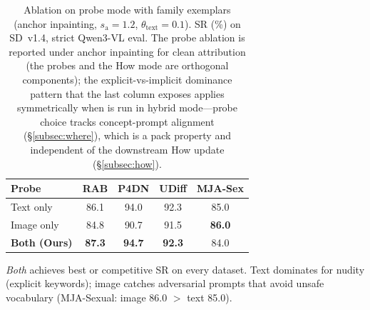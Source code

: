 \begin{table}[!tb]
    \centering
    \renewcommand{\arraystretch}{1.15}
    \setlength{\tabcolsep}{0.6em}
    \caption{Ablation on probe mode with family exemplars (anchor inpainting, $s_\text{a}{=}1.2$, $\theta_\text{text}{=}0.1$). SR (\%) on SD~v1.4, strict Qwen3-VL eval. The probe ablation is reported under anchor inpainting for clean attribution (the probes and the How mode are orthogonal components); the explicit-vs-implicit dominance pattern that the last column exposes applies symmetrically when \ours{} is run in hybrid mode---probe choice tracks concept-prompt alignment (\S\ref{subsec:where}), which is a pack property and independent of the downstream How update (\S\ref{subsec:how}).}
    \label{table:probe}
    \vspace{2pt}
    \small
    \begin{tabular}{lcccc}
    \toprule
    \textbf{Probe} & \textbf{RAB} & \textbf{P4DN} & \textbf{UDiff} & \textbf{MJA-Sex} \\
    \midrule
    Text only  & 86.1 & 94.0 & 92.3 & 85.0 \\
    Image only & 84.8 & 90.7 & 91.5 & \textbf{86.0} \\
    \rowcolor{blue!8} \textbf{Both (Ours)} & \textbf{87.3} & \textbf{94.7} & \textbf{92.3} & 84.0 \\
    \bottomrule
    \end{tabular}

    \vspace{0.4em}
    {\footnotesize \textit{Both} achieves best or competitive SR on every dataset. Text dominates for nudity (explicit keywords); image catches adversarial prompts that avoid unsafe vocabulary (MJA-Sexual: image 86.0 $>$ text 85.0).}
\end{table}
